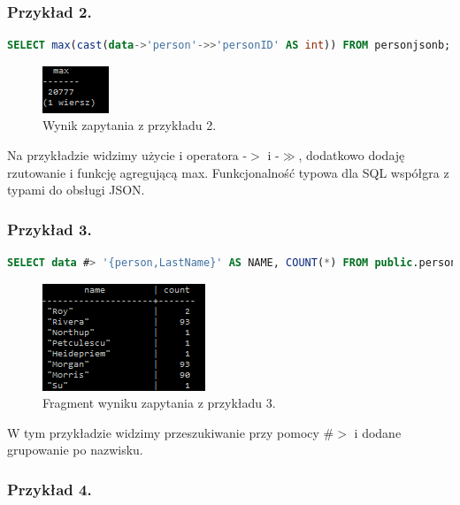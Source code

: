 \documentclass[a4paper,12pt,table]{article}
\begin{document}
{\subsubsection*{Przykład 2.}
\begin{lstlisting}[language=SQL,basicstyle=\footnotesize]
SELECT max(cast(data->'person'->>'personID' AS int)) FROM personjsonb;
\end{lstlisting}
\vspace{0.5cm}
\begin{figure}[h]
\begin{center}
\includegraphics[scale=1.1]{sc/2}
\end{center}
\caption{Wynik zapytania z przykładu 2.}
\end{figure}%
Na przykładzie widzimy użycie i operatora -$>$ i -$\gg$, dodatkowo dodaję rzutowanie i funkcję agregującą max. Funkcjonalność typowa dla SQL współgra z typami do obsługi JSON.\newpage
\subsubsection*{Przykład 3.}
\begin{lstlisting}[language=SQL,basicstyle=\footnotesize]
SELECT data #> '{person,LastName}' AS NAME, COUNT(*) FROM public.personjsonb GROUP BY NAME;
\end{lstlisting}
\vspace{0.5cm}
\begin{figure}[h]
\begin{center}
\includegraphics[scale=0.9]{sc/3}
\end{center}
\caption{Fragment wyniku zapytania z przykładu 3.}
\end{figure}%
W tym przykładzie widzimy przeszukiwanie przy pomocy \#$>$ i dodane grupowanie po nazwisku.

\subsubsection*{Przykład 4.}

}
\end{document}

